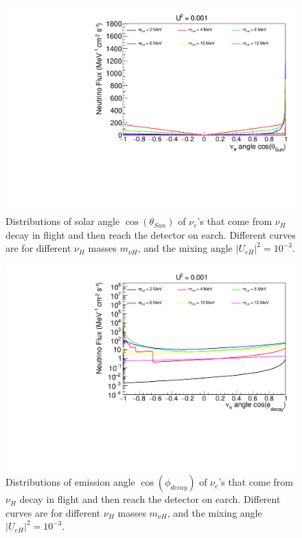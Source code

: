 \documentclass[%
 reprint,
 amsmath,amssymb,
 aps,
 prd,
twocolumn,
]{revtex4-1}
\begin{document}
\begin{figure}[!ht]
\includegraphics[width=0.99\columnwidth]{../plots/DecayInFlightNuLCosthetaSun_U0.001_AllMass_linXlinY.pdf}
\caption{Distributions of solar angle $\cos(\theta_{Sun})$ of $\nu_e$'s that come from $\nu_H$ decay in flight and then reach the detector on earch. Different curves are for different $\nu_H$ masses $m_{\nu H}$, and the mixing angle $|U_{eH}|^2 = 10^{-3}$.}
\label{fig:DecayInFlightTheta_U1em3_AllMass}
\end{figure}

\begin{figure}[!ht]
\includegraphics[width=0.99\columnwidth]{../plots/DecayInFlightNuLCosphiSun_U0.001_AllMass_linXlogY.pdf}
\caption{Distributions of emission angle $\cos(\phi_{decay})$ of $\nu_e$'s that come from $\nu_H$ decay in flight and then reach the detector on earch. Different curves are for different $\nu_H$ masses $m_{\nu H}$, and the mixing angle $|U_{eH}|^2 = 10^{-3}$.}
\label{fig:DecayInFlightPhi_U1em3_AllMass}
\end{figure}
\end{document}
